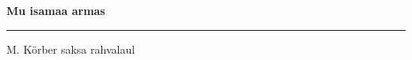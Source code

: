 \documentclass[10pt]{book}
\begin{document}
{
  \samepage
  \raggedbottom
  \raggedright
  \sloppy


  \vspace{0.2in}

  \noindent\begin{minipage}{.1\textwidth}
    \hfill\vspace{0.1in}
  \end{minipage}%
  \noindent\begin{minipage}{.8\textwidth}
    \centering
    \bfseries
    \large Mu isamaa armas
  \end{minipage}%
  \noindent\begin{minipage}{.1\textwidth}
      \hfill\vspace{0.1in}
  \end{minipage}

  \nopagebreak[4]
  \vspace{0.1in}
  \nopagebreak[4]
  \hrule height 0.05ex
  \nopagebreak[4]
  \vspace{-0.05in}

  {\footnotesize M. K\"orber \hfill saksa rahvalaul }\\
  \vspace{0.01in}



}
\end{document}
